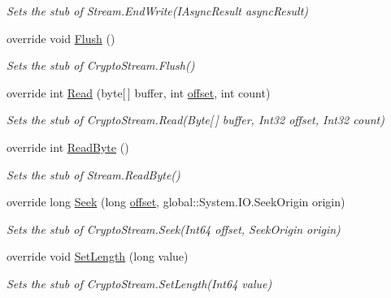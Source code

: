 \begin{DoxyCompactItemize}
\begin{DoxyCompactList}\small\item\em Sets the stub of Stream.\-End\-Write(\-I\-Async\-Result async\-Result)\end{DoxyCompactList}\item 
override void \hyperlink{class_system_1_1_security_1_1_cryptography_1_1_fakes_1_1_stub_crypto_stream_aafb6a3c317b593d85ca79809a7adc4ad}{Flush} ()
\begin{DoxyCompactList}\small\item\em Sets the stub of Crypto\-Stream.\-Flush()\end{DoxyCompactList}\item 
override int \hyperlink{class_system_1_1_security_1_1_cryptography_1_1_fakes_1_1_stub_crypto_stream_a8fcfac088666dae83ad6bbd3baee6377}{Read} (byte\mbox{[}$\,$\mbox{]} buffer, int \hyperlink{jquery-1_810_82_8js_a4a9f594d20d927164551fc7fa4751a2f}{offset}, int count)
\begin{DoxyCompactList}\small\item\em Sets the stub of Crypto\-Stream.\-Read(\-Byte\mbox{[}$\,$\mbox{]} buffer, Int32 offset, Int32 count)\end{DoxyCompactList}\item 
override int \hyperlink{class_system_1_1_security_1_1_cryptography_1_1_fakes_1_1_stub_crypto_stream_aca1c68c4ec3695f26fcc5196ffdf866a}{Read\-Byte} ()
\begin{DoxyCompactList}\small\item\em Sets the stub of Stream.\-Read\-Byte()\end{DoxyCompactList}\item 
override long \hyperlink{class_system_1_1_security_1_1_cryptography_1_1_fakes_1_1_stub_crypto_stream_a1e2f52e6a0eb2df795d5160669e8b060}{Seek} (long \hyperlink{jquery-1_810_82_8js_a4a9f594d20d927164551fc7fa4751a2f}{offset}, global\-::\-System.\-I\-O.\-Seek\-Origin origin)
\begin{DoxyCompactList}\small\item\em Sets the stub of Crypto\-Stream.\-Seek(\-Int64 offset, Seek\-Origin origin)\end{DoxyCompactList}\item 
override void \hyperlink{class_system_1_1_security_1_1_cryptography_1_1_fakes_1_1_stub_crypto_stream_a8d49b5b32496c67709f0824a7de64268}{Set\-Length} (long value)
\begin{DoxyCompactList}\small\item\em Sets the stub of Crypto\-Stream.\-Set\-Length(\-Int64 value)\end{DoxyCompactList}\item 

\end{DoxyCompactItemize}
